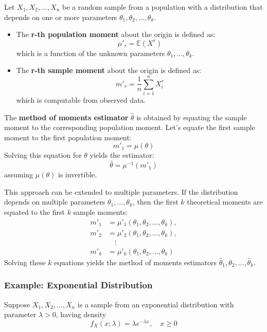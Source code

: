\documentclass[twoside]{book}
\begin{document}
Let \( X_1, X_2, \dots, X_n \) be a random sample from a population with a distribution that depends on one or more parameters \( \theta_1, \theta_2, \dots, \theta_k \).

\begin{itemize}
    \item The \textbf{r-th population moment} about the origin is defined as:
    \[
    \mu'_r = \mathbb{E}\left( X^r\right)
    \]
    which is a function of the unknown parameters \( \theta_1, \dots, \theta_k \).

    \item The \textbf{r-th sample moment} about the origin is defined as:
    \[
    m'_r = \frac{1}{n} \sum_{i=1}^n X_i^r
    \]
    which is computable from observed data.
\end{itemize}

The \textbf{method of moments estimator} \( \hat{\theta} \) is obtained by equating the sample moment to the corresponding population moment. Let's equate the first sample moment to the first population moment:
\[
m'_1 = \mu(\theta)
\]
Solving this equation for \( \theta \) yields the estimator:
\[
\hat{\theta} = \mu^{-1}(m'_1)
\]
assuming \( \mu(\theta) \) is invertible.

\medskip

\noindent This approach can be extended to multiple parameters. If the distribution depends on multiple parameters \( \theta_1, \dots, \theta_k \), then the first \( k \) theoretical moments are equated to the first \( k \) sample moments:
\begin{align*}
m'_1 &= \mu'_1(\theta_1,\theta_2, \dots, \theta_k), \\
m'_2 &= \mu'_2(\theta_1,\theta_2, \dots, \theta_k), \\
&\quad \vdots \\
m'_k &= \mu'_k(\theta_1,\theta_2, \dots, \theta_k)
\end{align*}
Solving these \( k \) equations yields the method of moments estimators \( \hat{\theta}_1,\theta_2, \dots, \hat{\theta}_k \).

\subsubsection*{Example: Exponential Distribution}

Suppose \( X_1,X_2, \dots, X_n \) is a sample from an exponential distribution with parameter \( \lambda > 0 \), having density
\[
f_{X}(x; \lambda) = \lambda e^{-\lambda x}, \quad x \geq 0
\]
\end{document}

